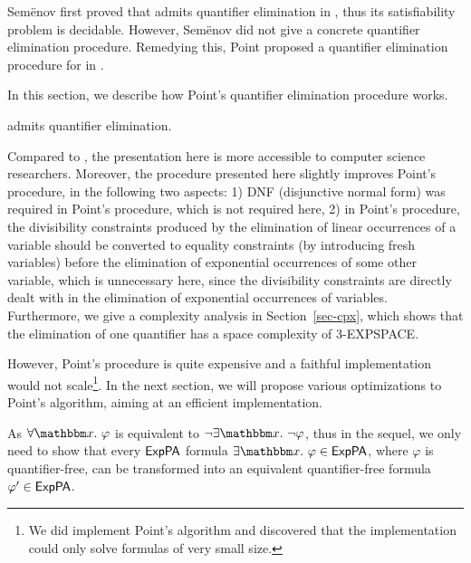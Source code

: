 
Semënov first proved that  {\paexp} admits quantifier elimination in \cite{Semenov84}, thus its satisfiability problem is decidable. However, Semënov did not give a concrete quantifier elimination procedure. Remedying this, Point proposed a quantifier elimination procedure for {\paexp} in \cite{Point86}. 

In this section, we describe how Point's quantifier elimination procedure works. 
%
\begin{theorem}
\label{thm-paexp}
{\paexp} admits quantifier elimination. 
\end{theorem}
%
Compared to \cite{Point86}, the presentation here is more accessible to computer science researchers. Moreover, the procedure presented here slightly improves Point's procedure, in the following two aspects: 1) DNF (disjunctive normal form) was required in Point's procedure, which is not required here, 2) in Point's procedure, the divisibility constraints produced by the elimination of linear occurrences of a variable should be converted to equality constraints (by introducing fresh variables) before the elimination of exponential occurrences of some other variable, which is unnecessary here, since the divisibility constraints are directly dealt with in the elimination of exponential occurrences of variables.
Furthermore, we give a complexity analysis in Section~\ref{sec-cpx}, which shows that the elimination of one quantifier has a space complexity of 3-EXPSPACE. 
%

However, Point's procedure is quite expensive and a faithful implementation would not scale\footnote{We did implement Point's algorithm and discovered that the implementation could only solve formulas of very small size.}. In the next section, we will propose various optimizations to Point's algorithm, aiming at an efficient implementation. 

\smallskip

As $\forall \ivarx. \ \varphi$ is equivalent to $\neg \exists \ivarx. \ \neg \varphi$,  thus in the sequel, we only need to  show that every ${\sf ExpPA}$ formula $\exists \ivarx.\ \varphi \in \paexp$, where $\varphi$ is quantifier-free, can be transformed into an equivalent quantifier-free formula $\varphi' \in {\sf ExpPA}$.



